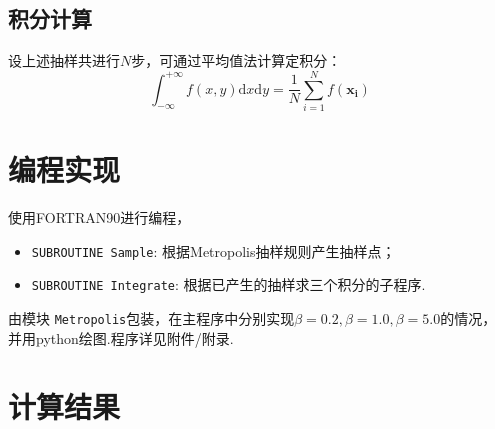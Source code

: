 \documentclass[12pt,a4paper,utf8]{ctexart}
\begin{document}
\subsection{积分计算}

设上述抽样共进行$N$步，可通过平均值法计算定积分：
\begin{equation}
    \int _{-\infty} ^{+\infty} f(x, y) \textrm{d}x \textrm{d}y
    = \frac{1}{N} \sum _{i=1} ^ N f(\mathbf{x_i})
\end{equation}

\section{编程实现}

使用FORTRAN90进行编程，
\begin{itemize}
    \item \texttt{SUBROUTINE Sample}: 根据Metropolis抽样规则产生抽样点；
    \item \texttt{SUBROUTINE Integrate}: 根据已产生的抽样求三个积分的子程序.
\end{itemize}

由模块
\texttt{Metropolis}包装，在主程序中分别实现$\beta=0.2,\beta=1.0,\beta=5.0$的情况，
并用python绘图.程序详见附件/附录.
\newpage
\section{计算结果}
\end{document}

